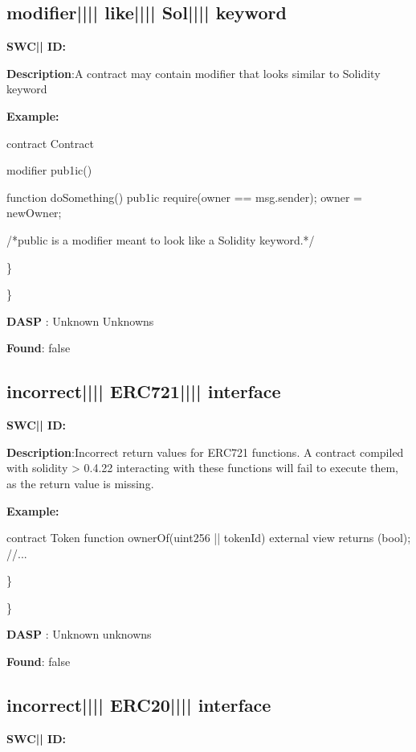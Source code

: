 \documentclass{article}
\begin{document}
\subsection{modifier{||\textunderscore|| }like{||\textunderscore|| }Sol{||\textunderscore|| }keyword} 
\textbf{SWC{|\textunderscore| }ID:} 

\textbf{Description}:A contract may contain modifier that looks similar to Solidity keyword


\textbf{Example:} 
\begin{ffcode} 

contract Contract{
    modifier pub1ic() {
    }

    function doSomething() pub1ic {
        require(owner == msg.sender);
        owner = newOwner;
    }
}

 /*public is a modifier meant to look like a Solidity keyword.*/ 

\end{ffcode} 
\} 

\} 

\textbf{DASP} : Unknown Unknowns

\textbf{Found}: false

\subsection{incorrect{||\textunderscore|| }ERC721{||\textunderscore|| }interface} 
\textbf{SWC{|\textunderscore| }ID:} 

\textbf{Description}:Incorrect return values for ERC721 functions. A contract compiled with solidity > 0.4.22 interacting with these functions will fail to execute them, as the return value is missing.


\textbf{Example:} 
\begin{ffcode} 

contract Token{
    function ownerOf(uint256 |\textunderscore| tokenId) external view returns (bool);
    //...
}

\end{ffcode} 
\} 

\} 

\textbf{DASP} : Unknown unknowns

\textbf{Found}: false

\subsection{incorrect{||\textunderscore|| }ERC20{||\textunderscore|| }interface} 
\textbf{SWC{|\textunderscore| }ID:} 
\end{document}
